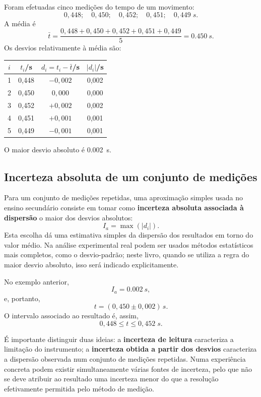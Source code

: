 \documentclass[11pt,a4paper,openany]{book}
\begin{document}
\begin{exemploresolvido}
Foram efetuadas cinco medições do tempo de um movimento:
\[
0,448;\quad0,450;\quad0,452;\quad0,451;\quad0,449\;\si{s}.
\]
A média é
\[
\bar t=\frac{0,448+0,450+0,452+0,451+0,449}{5}
      =\SI{0.450}{s}.
\]
Os desvios relativamente à média são:

\begin{center}
\begin{tabular}{@{}cccc@{}}
\toprule
$i$ & $t_i$/s & $d_i=t_i-\bar t$/s & $|d_i|$/s\\
\midrule
1 & 0,448 & $-0,002$ & 0,002\\
2 & 0,450 & $0,000$  & 0,000\\
3 & 0,452 & $+0,002$ & 0,002\\
4 & 0,451 & $+0,001$ & 0,001\\
5 & 0,449 & $-0,001$ & 0,001\\
\bottomrule
\end{tabular}
\end{center}

O maior desvio absoluto é \SI{0.002}{s}.
\end{exemploresolvido}

\subsection{Incerteza absoluta de um conjunto de medições}

Para um conjunto de medições repetidas, uma aproximação simples usada no ensino secundário consiste em tomar como \textbf{incerteza absoluta associada à dispersão} o maior dos desvios absolutos:
\[
\boxed{I_a=\max\left(|d_i|\right)}.
\]
Esta escolha dá uma estimativa simples da dispersão dos resultados em torno do valor médio. Na análise experimental real podem ser usados métodos estatísticos mais completos, como o desvio-padrão; neste livro, quando se utiliza a regra do maior desvio absoluto, isso será indicado explicitamente.

No exemplo anterior,
\[
I_a=\SI{0.002}{s},
\]
e, portanto,
\[
\boxed{t=(0,450\pm0,002)\,\si{s}}.
\]
O intervalo associado ao resultado é, assim,
\[
0,448\leq t\leq0,452\;\si{s}.
\]

\begin{nota}
É importante distinguir duas ideias: a \textbf{incerteza de leitura} caracteriza a limitação do instrumento; a \textbf{incerteza obtida a partir dos desvios} caracteriza a dispersão observada num conjunto de medições repetidas. Numa experiência concreta podem existir simultaneamente várias fontes de incerteza, pelo que não se deve atribuir ao resultado uma incerteza menor do que a resolução efetivamente permitida pelo método de medição.
\end{nota}
\end{document}
